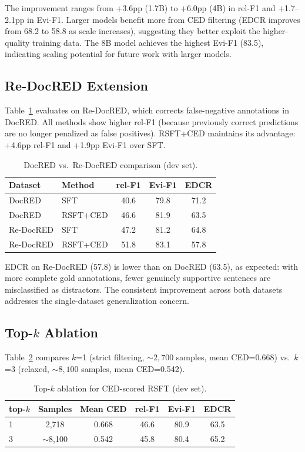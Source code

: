 \documentclass[11pt,a4paper]{article}
\begin{document}
The improvement ranges from +3.6pp (1.7B) to +6.0pp (4B) in rel-F1 and +1.7--2.1pp in Evi-F1. Larger models benefit more from CED filtering (EDCR improves from 68.2 to 58.8 as scale increases), suggesting they better exploit the higher-quality training data. The 8B model achieves the highest Evi-F1 (83.5), indicating scaling potential for future work with larger models.

\subsection{Re-DocRED Extension}

Table~\ref{tab:redocred} evaluates on Re-DocRED, which corrects false-negative annotations in DocRED. All methods show higher rel-F1 (because previously correct predictions are no longer penalized as false positives). RSFT+CED maintains its advantage: +4.6pp rel-F1 and +1.9pp Evi-F1 over SFT.

\begin{table}[t]
\centering
\caption{DocRED vs.\ Re-DocRED comparison (dev set).}
\label{tab:redocred}
\begin{tabular}{llccc}
\toprule
\textbf{Dataset} & \textbf{Method} & \textbf{rel-F1} & \textbf{Evi-F1} & \textbf{EDCR} \\
\midrule
DocRED & SFT & 40.6 & 79.8 & 71.2 \\
DocRED & RSFT+CED & 46.6 & 81.9 & 63.5 \\
\midrule
Re-DocRED & SFT & 47.2 & 81.2 & 64.8 \\
Re-DocRED & RSFT+CED & 51.8 & 83.1 & 57.8 \\
\bottomrule
\end{tabular}
\end{table}

EDCR on Re-DocRED (57.8) is lower than on DocRED (63.5), as expected: with more complete gold annotations, fewer genuinely supportive sentences are misclassified as distractors. The consistent improvement across both datasets addresses the single-dataset generalization concern.

\subsection{Top-$k$ Ablation}

Table~\ref{tab:topk} compares $k$=1 (strict filtering, ${\sim}2{,}700$ samples, mean CED=0.668) vs.\ $k$=3 (relaxed, ${\sim}8{,}100$ samples, mean CED=0.542).

\begin{table}[h]
\centering
\caption{Top-$k$ ablation for CED-scored RSFT (dev set).}
\label{tab:topk}
\begin{tabular}{lccccc}
\toprule
\textbf{top-$k$} & \textbf{Samples} & \textbf{Mean CED} & \textbf{rel-F1} & \textbf{Evi-F1} & \textbf{EDCR} \\
\midrule
1 & 2,718 & 0.668 & 46.6 & 80.9 & 63.5 \\
3 & $\sim$8,100 & 0.542 & 45.8 & 80.4 & 65.2 \\
\bottomrule
\end{tabular}
\end{table}
\end{document}

